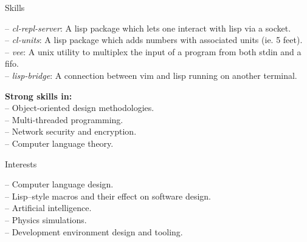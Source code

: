 \documentclass[letterpaper, 11pt]{article}
\begin{document}
\begin{resume}
\begin{category}{Skills}
\begin{block}
                -- \emph{cl-repl-server}: A lisp package which lets one interact with lisp via a socket.        \\
                -- \emph{cl-units}: A lisp package which adds numbers with associated units (ie. 5 feet).       \\
                -- \emph{vee}: A unix utility to multiplex the input of a program from both stdin and a fifo.   \\
                -- \emph{lisp-bridge}: A connection between vim and lisp running on another terminal.
            \end{block}
            \begin{block}
                \textbf{Strong skills in:}                                          \\
                -- Object-oriented design methodologies.                            \\
                -- Multi-threaded programming.                                      \\
                -- Network security and encryption.                                 \\
                -- Computer language theory.
            \end{block}
        \end{category}
        \begin{category}{Interests}
            \begin{block}
                -- Computer language design.                                        \\
                -- Lisp--style macros and their effect on software design.          \\
                -- Artificial intelligence.                                         \\
                -- Physics simulations.                                             \\
                -- Development environment design and tooling.
            \end{block}
        \end{category}
    \end{resume}
\end{document}
